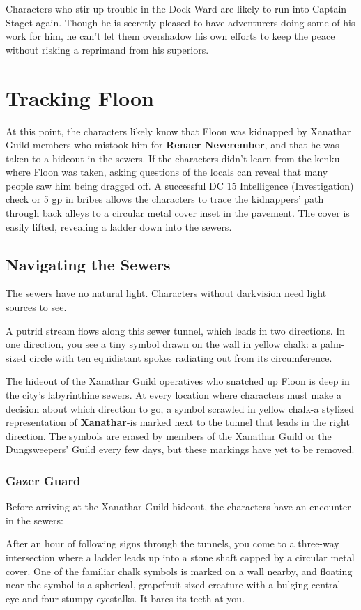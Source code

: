 \documentclass[10pt,a4paper,twoside,twocolumn,openany,nodeprecatedcode]{dndbook}
\begin{document}
Characters who stir up trouble in the Dock Ward are likely to run into Captain Staget again. Though he is secretly pleased to have adventurers doing some of his work for him, he can't let them overshadow his own efforts to keep the peace without risking a reprimand from his superiors.
\section{Tracking Floon}
At this point, the characters likely know that Floon was kidnapped by Xanathar Guild members who mistook him for \textbf{Renaer Neverember}, and that he was taken to a hideout in the sewers. If the characters didn't learn from the kenku where Floon was taken, asking questions of the locals can reveal that many people saw him being dragged off. A successful DC 15 Intelligence (Investigation) check or 5 gp in bribes allows the characters to trace the kidnappers' path through back alleys to a circular metal cover inset in the pavement. The cover is easily lifted, revealing a ladder down into the sewers.
\subsection{Navigating the Sewers}
The sewers have no natural light. Characters without darkvision need light sources to see.
\begin{DndReadAloud}{}
A putrid stream flows along this sewer tunnel, which leads in two directions. In one direction, you see a tiny symbol drawn on the wall in yellow chalk: a palm-sized circle with ten equidistant spokes radiating out from its circumference.
\end{DndReadAloud}

The hideout of the Xanathar Guild operatives who snatched up Floon is deep in the city's labyrinthine sewers. At every location where characters must make a decision about which direction to go, a symbol scrawled in yellow chalk-a stylized representation of \textbf{Xanathar}-is marked next to the tunnel that leads in the right direction. The symbols are erased by members of the Xanathar Guild or the Dungsweepers' Guild every few days, but these markings have yet to be removed.
\subsubsection{Gazer Guard}
Before arriving at the Xanathar Guild hideout, the characters have an encounter in the sewers:
\begin{DndReadAloud}{}
After an hour of following signs through the tunnels, you come to a three-way intersection where a ladder leads up into a stone shaft capped by a circular metal cover. One of the familiar chalk symbols is marked on a wall nearby, and floating near the symbol is a spherical, grapefruit-sized creature with a bulging central eye and four stumpy eyestalks. It bares its teeth at you.
\end{DndReadAloud}
\end{document}
